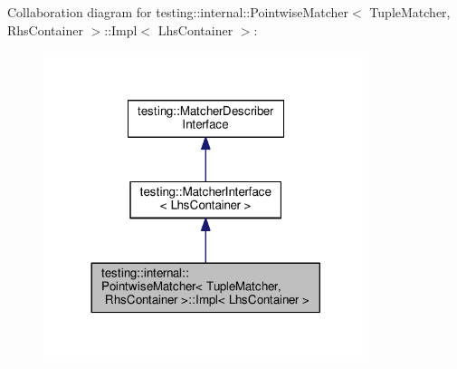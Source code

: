Collaboration diagram for testing\+:\+:internal\+:\+:Pointwise\+Matcher$<$ Tuple\+Matcher, Rhs\+Container $>$\+:\+:Impl$<$ Lhs\+Container $>$\+:\nopagebreak
\begin{figure}[H]
\begin{center}
\leavevmode
\includegraphics[width=269pt]{classtesting_1_1internal_1_1PointwiseMatcher_1_1Impl__coll__graph}
\end{center}
\end{figure}
